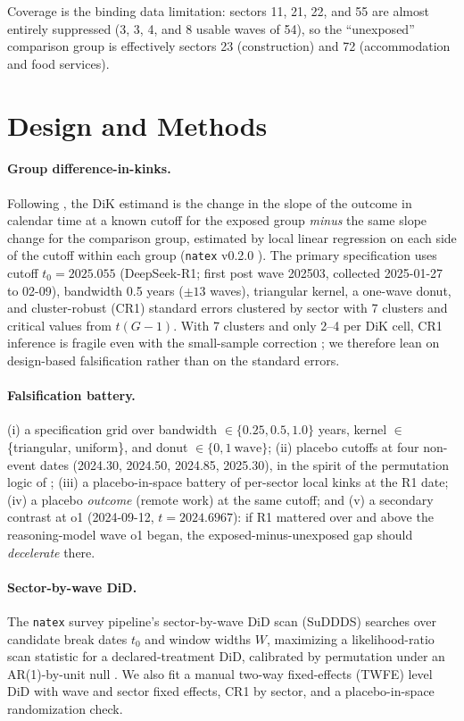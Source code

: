 \documentclass[11pt]{article}
\newcommand{\natex}{\texttt{natex}}
\begin{document}
Coverage is the binding data limitation: sectors 11, 21, 22, and 55 are almost
entirely suppressed (3, 3, 4, and 8 usable waves of 54), so the ``unexposed''
comparison group is effectively sectors 23 (construction) and 72
(accommodation and food services).

\section{Design and Methods}\label{sec:methods}

\paragraph{Group difference-in-kinks.} Following \cite{bockerman2025}, the DiK
estimand is the change in the slope of the outcome in calendar time at a known
cutoff for the exposed group \emph{minus} the same slope change for the
comparison group, estimated by local linear regression on each side of the
cutoff within each group (\natex{} v0.2.0 \cite{natex}). The primary
specification uses cutoff $t_0=2025.055$ (DeepSeek-R1; first post wave 202503,
collected 2025-01-27 to 02-09), bandwidth 0.5 years ($\pm 13$ waves),
triangular kernel, a one-wave donut, and cluster-robust (CR1) standard errors
clustered by sector with 7 clusters and critical values from $t(G-1)$. With 7
clusters and only 2--4 per DiK cell, CR1 inference is fragile even with the
small-sample correction \cite{cameron2015}; we therefore lean on design-based
falsification rather than on the standard errors.

\paragraph{Falsification battery.} (i) a specification grid over bandwidth
$\in \{0.25, 0.5, 1.0\}$ years, kernel $\in$ \{triangular, uniform\}, and donut
$\in \{0, 1\ \text{wave}\}$; (ii) placebo cutoffs at four non-event dates
(2024.30, 2024.50, 2024.85, 2025.30), in the spirit of the permutation logic of
\cite{ganong2018}; (iii) a placebo-in-space battery of per-sector local kinks at
the R1 date; (iv) a placebo \emph{outcome} (remote work) at the same cutoff; and
(v) a secondary contrast at o1 (2024-09-12, $t=2024.6967$): if R1 mattered over
and above the reasoning-model wave o1 began, the exposed-minus-unexposed gap
should \emph{decelerate} there.

\paragraph{Sector-by-wave DiD.} The \natex{} survey pipeline's sector-by-wave
DiD scan (SuDDDS) searches over candidate break dates $t_0$ and window widths
$W$, maximizing a likelihood-ratio scan statistic for a declared-treatment DiD,
calibrated by permutation under an AR(1)-by-unit null \cite{herlands2018}. We
also fit a manual two-way fixed-effects (TWFE) level DiD with wave and sector
fixed effects, CR1 by sector, and a placebo-in-space randomization check.
\end{document}
